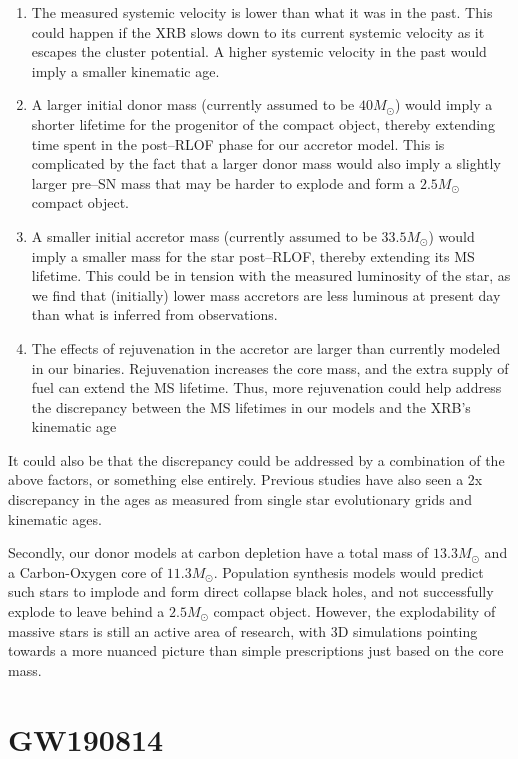 \documentclass[linenumbers,trackchanges,twocolumn]{aastex701}
\begin{document}
\begin{enumerate}
    \item The measured systemic velocity is lower than what it was in the past. This could happen if the XRB slows down to its current systemic velocity as it escapes the cluster potential. A higher systemic velocity in the past would imply a smaller kinematic age.
    \item A larger initial donor mass (currently assumed to be $40M_{\odot}$) would imply a shorter lifetime for the progenitor of the compact object, thereby extending time spent in the post--RLOF phase for our accretor model. This is complicated by the fact that a larger donor mass would also imply a slightly larger pre--SN mass that may be harder to explode and form a $2.5M_{\odot}$ compact object.
    \item A smaller initial accretor mass (currently assumed to be $33.5M_{\odot}$) would imply a smaller mass for the star post--RLOF, thereby extending its MS lifetime. This could be in tension with the measured luminosity of the star, as we find that (initially) lower mass accretors are less luminous at present day than what is inferred from observations.
    \item The effects of rejuvenation in the accretor are larger than currently modeled in our binaries. Rejuvenation increases the core mass, and the extra supply of fuel can extend the MS lifetime. Thus, more rejuvenation could help address the discrepancy between the MS lifetimes in our models and the XRB's kinematic age
\end{enumerate}

It could also be that the discrepancy could be addressed by a combination of the above factors, or something else entirely. Previous studies have also seen a 2x discrepancy in the ages as measured from single star evolutionary grids and kinematic ages.


Secondly, our donor models at carbon depletion have a total mass of $13.3M_{\odot}$ and a Carbon-Oxygen core of $11.3M_{\odot}$. Population synthesis models would predict such stars to implode and form direct collapse black holes, and not successfully explode to leave behind a $2.5M_{\odot}$ compact object. However, the explodability of massive stars is still an active area of research, with 3D simulations pointing towards a more nuanced picture than simple prescriptions just based on the core mass.

\section{GW190814}
\end{document}
